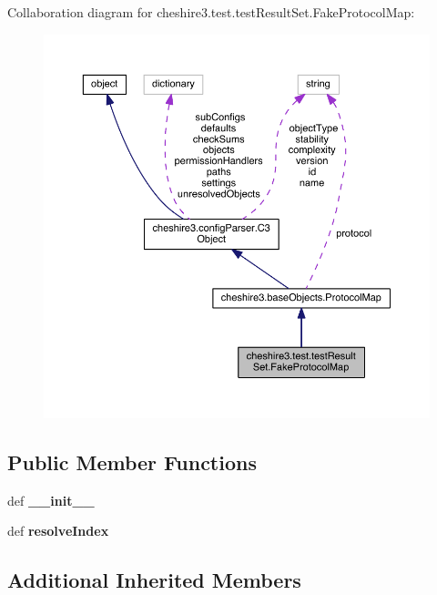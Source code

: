 Collaboration diagram for cheshire3.\-test.\-test\-Result\-Set.\-Fake\-Protocol\-Map\-:
\nopagebreak
\begin{figure}[H]
\begin{center}
\leavevmode
\includegraphics[width=350pt]{classcheshire3_1_1test_1_1test_result_set_1_1_fake_protocol_map__coll__graph}
\end{center}
\end{figure}
\subsection*{Public Member Functions}
\begin{DoxyCompactItemize}
\item 
\hypertarget{classcheshire3_1_1test_1_1test_result_set_1_1_fake_protocol_map_a1cb9ef98f9f4a5d4d8133d036a8a4d59}{def {\bfseries \-\_\-\-\_\-init\-\_\-\-\_\-}}\label{classcheshire3_1_1test_1_1test_result_set_1_1_fake_protocol_map_a1cb9ef98f9f4a5d4d8133d036a8a4d59}

\item 
\hypertarget{classcheshire3_1_1test_1_1test_result_set_1_1_fake_protocol_map_a870a0f3d4cabfa8f7ce0d55a5cd4cc80}{def {\bfseries resolve\-Index}}\label{classcheshire3_1_1test_1_1test_result_set_1_1_fake_protocol_map_a870a0f3d4cabfa8f7ce0d55a5cd4cc80}

\end{DoxyCompactItemize}
\subsection*{Additional Inherited Members}


